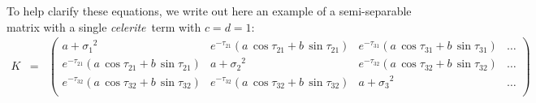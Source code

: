 \documentclass[manuscript, letterpaper]{aastex6}
\newcommand{\celeriteterm}{\emph{celerite}}
\newcommand{\eqlabel}[1]{\label{eq:#1}}
\begin{document}
To help clarify these equations, we write out here an example of a semi-separable matrix with a 
single \celeriteterm\ term with $c=d=1$: %
\begin{eqnarray}\eqlabel{semi-separable-structure}
K&=&%
\begin{pmatrix}
    {\scriptscriptstyle a+{\sigma_1}^2 }& {\scriptscriptstyle e^{-\tau_{21}}\left(a\,\cos{\tau_{21}}+b\,\sin{\tau_{21}}\right)} & {\scriptscriptstyle e^{-\tau_{31}}\left(a\,\cos{\tau_{31}}+b\,\sin{\tau_{31}}\right)} & \ldots\\ 
    {\scriptscriptstyle e^{-\tau_{21}}\left(a\,\cos{\tau_{21}}+b\,\sin{\tau_{21}}\right)}&{\scriptscriptstyle a+{\sigma_2}^2 }& {\scriptscriptstyle e^{-\tau_{32}}\left(a\,\cos{\tau_{32}}+b\,\sin{\tau_{32}}\right)} & \ldots\\
    {\scriptscriptstyle e^{-\tau_{32}}\left(a\,\cos{\tau_{32}}+b\,\sin{\tau_{32}}\right)}&{\scriptscriptstyle  e^{-\tau_{32}}\left(a\,\cos{\tau_{32}}+b\,\sin{\tau_{32}}\right)} & \scriptscriptstyle{a + {\sigma_3}^2} & \ldots \\

\end{pmatrix}
\end{eqnarray}
\end{document}
